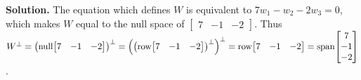 \documentclass[11pt, letterpaper]{report}
\newenvironment{book}{}{}
\let\originalleft\left
\let\originalright\right
\renewcommand{\left}{\mathopen{}\mathclose\bgroup\originalleft}
\renewcommand{\right}{\aftergroup\egroup\originalright}
\DeclareMathOperator{\row}{row}
\DeclareMathOperator{\nul}{null}
\DeclareMathOperator{\spn}{span}
\newcommand{\bbbvec}[3]{
  \begin{bmatrix} #1 \\ #2 \\ #3 \end{bmatrix}
}
\begin{document}
\begin{book}
\textbf{Solution.} The equation which defines $W$ is equivalent to $7w_1-w_2-2w_3=0$, which makes $W$ equal to the null space of $\begin{bmatrix}
7 & -1 & -2
\end{bmatrix}$. Thus $W^{\perp}=\left(\nul \begin{bmatrix}
7 & -1 & -2
\end{bmatrix} \right)^{\perp}=\left(\left(\row \begin{bmatrix}
7 & -1 & -2
\end{bmatrix}\right)^{\perp}\right)^{\perp} = \row \begin{bmatrix}
7 & -1 & -2
\end{bmatrix} = \spn \bbbvec{7}{-1}{-2}$. \blacksquare
\end{book}
\end{document}
